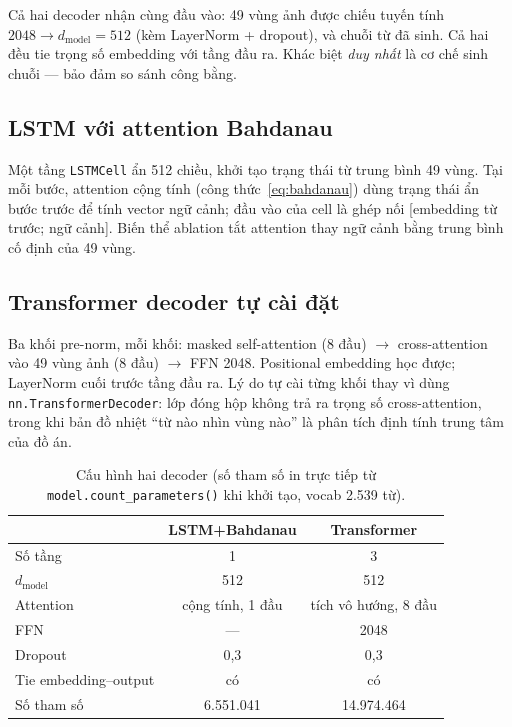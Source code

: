 Cả hai decoder nhận cùng đầu vào: 49 vùng ảnh được chiếu tuyến tính
$2048 \to d_{\text{model}} = 512$ (kèm LayerNorm + dropout), và chuỗi từ đã sinh.
Cả hai đều tie trọng số embedding với tầng đầu ra. Khác biệt \emph{duy nhất} là
cơ chế sinh chuỗi --- bảo đảm so sánh công bằng.

\subsection{LSTM với attention Bahdanau}
Một tầng \texttt{LSTMCell} ẩn 512 chiều, khởi tạo trạng thái từ trung bình 49
vùng. Tại mỗi bước, attention cộng tính (công thức~\ref{eq:bahdanau}) dùng trạng
thái ẩn bước trước để tính vector ngữ cảnh; đầu vào của cell là ghép nối
[embedding từ trước; ngữ cảnh]. Biến thể ablation tắt attention thay ngữ cảnh
bằng trung bình cố định của 49 vùng.

\subsection{Transformer decoder tự cài đặt}
Ba khối pre-norm, mỗi khối: masked self-attention (8 đầu) $\to$ cross-attention
vào 49 vùng ảnh (8 đầu) $\to$ FFN 2048. Positional embedding học được; LayerNorm
cuối trước tầng đầu ra. Lý do tự cài từng khối thay vì dùng
\texttt{nn.TransformerDecoder}: lớp đóng hộp không trả ra trọng số
cross-attention, trong khi bản đồ nhiệt ``từ nào nhìn vùng nào'' là phân tích
định tính trung tâm của đồ án.

\begin{table}[H]
	\centering
	\caption{Cấu hình hai decoder (số tham số in trực tiếp từ
	\texttt{model.count\_parameters()} khi khởi tạo, vocab 2.539 từ).}
	\label{tab:architecture}
	\begin{tabular}{lcc}
		\hline
		 & \textbf{LSTM+Bahdanau} & \textbf{Transformer} \\
		\hline
		Số tầng & 1 & 3 \\
		$d_{\text{model}}$ & 512 & 512 \\
		Attention & cộng tính, 1 đầu & tích vô hướng, 8 đầu \\
		FFN & --- & 2048 \\
		Dropout & 0,3 & 0,3 \\
		Tie embedding--output & có & có \\
		Số tham số & 6.551.041 & 14.974.464 \\
		\hline
	\end{tabular}
\end{table}

